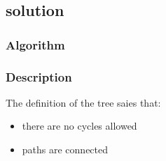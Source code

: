 \subsection{solution}

\subsubsection{Algorithm}
% 
% 

\subsubsection{Description}
The definition of the tree saies that:
\begin{itemize}
 \item there are no cycles allowed
 \item paths are connected
\end{itemize}
